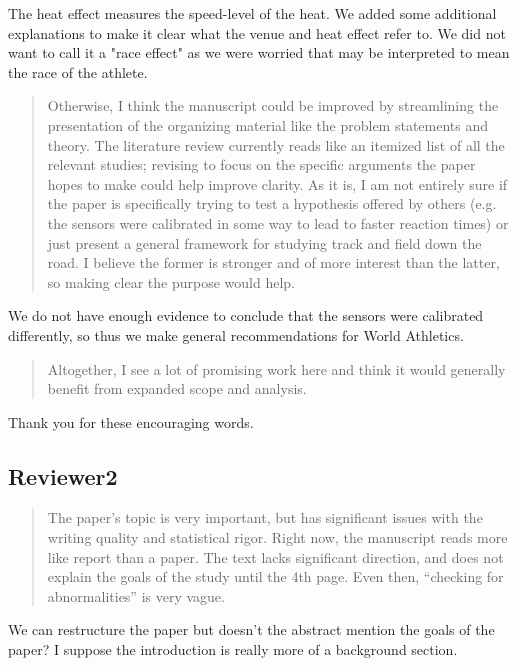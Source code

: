 \documentclass[12pt]{article}
\newenvironment{comment}%
{\begin{quotation}\noindent\small\it\color{darkblue}\ignorespaces%
}{\end{quotation}}
\begin{document}
The heat effect measures the speed-level of the heat.  We added some additional
explanations to make it clear what the venue and heat effect refer to. We did
not want to call it a "race effect" as we were worried that may be interpreted
to mean the race of the athlete.


\begin{comment}
Otherwise, I think the manuscript could be improved by streamlining the
presentation of the organizing material like the problem statements and theory.
The literature review currently reads like an itemized list of all the relevant
studies; revising to focus on the specific arguments the paper hopes to make
could help improve clarity. As it is, I am not entirely sure if the paper is
specifically trying to test a hypothesis offered by others (e.g. the sensors
were calibrated in some way to lead to faster reaction times) or just present a
general framework for studying track and field down the road. I believe the
former is stronger and of more interest than the latter, so making clear the
purpose would help.

\end{comment}  
We do not have enough evidence to conclude that the sensors were calibrated
differently, so thus we make general recommendations for World Athletics.

\begin{comment}
Altogether, I see a lot of promising work here and think it would generally
benefit from expanded scope and analysis.
\end{comment}


Thank you for these encouraging words.

\subsection*{Reviewer2}


\begin{comment}
The paper’s topic is very important, but has significant issues with the writing
quality and statistical rigor. Right now, the manuscript reads more like report
than a paper. The text lacks significant direction, and does not explain the
goals of the study until the 4th page. Even then, “checking for abnormalities”
is very vague.

\end{comment}


We can restructure the paper but doesn't the abstract mention the goals of the
paper? I suppose the introduction is really more of a background section.
\end{document}
